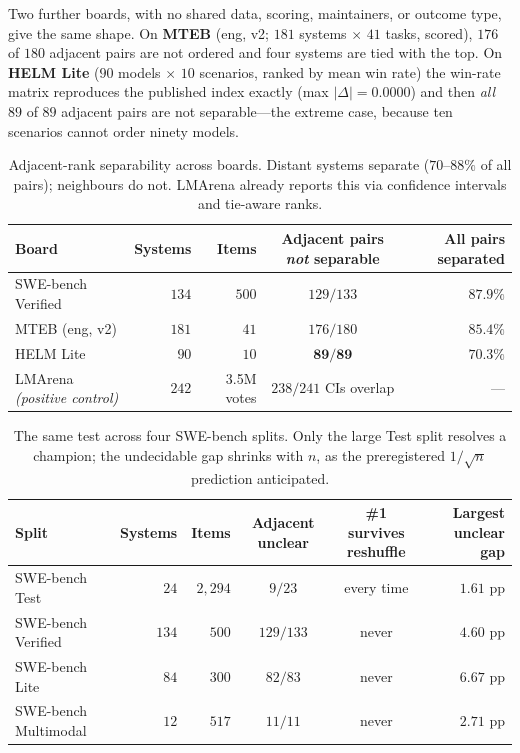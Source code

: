\documentclass{article}
\begin{document}
Two further boards, with no shared data, scoring, maintainers, or outcome type, give the same shape.
On \textbf{MTEB} (eng, v2; $181$ systems $\times$ $41$ tasks, scored), $176$ of $180$ adjacent pairs
are not ordered and four systems are tied with the top. On \textbf{HELM Lite} ($90$ models $\times$
$10$ scenarios, ranked by mean win rate) the win-rate matrix reproduces the published index exactly
(max $|\Delta| = 0.0000$) and then \emph{all} $89$ of $89$ adjacent pairs are not separable---the
extreme case, because ten scenarios cannot order ninety models.

\begin{table}[t]
\centering\small
\begin{tabular}{lrrcr}
\toprule
Board & Systems & Items & Adjacent pairs \emph{not} separable & All pairs separated\\
\midrule
SWE-bench Verified & $134$ & $500$ & $129/133$ & $87.9\%$\\
MTEB (eng, v2)     & $181$ & $41$  & $176/180$ & $85.4\%$\\
HELM Lite          & $90$  & $10$  & $\mathbf{89/89}$ & $70.3\%$\\
\midrule
LMArena \emph{(positive control)} & $242$ & 3.5M votes & $238/241$ CIs overlap & ---\\
\bottomrule
\end{tabular}
\caption{Adjacent-rank separability across boards. Distant systems separate ($70$--$88\%$ of all
pairs); neighbours do not. LMArena already reports this via confidence intervals and tie-aware ranks.}
\label{tab:main}
\end{table}

\begin{table}[t]
\centering\small
\begin{tabular}{lrrccr}
\toprule
Split & Systems & Items & Adjacent unclear & \#1 survives reshuffle & Largest unclear gap\\
\midrule
SWE-bench Test        & $24$  & $2{,}294$ & $9/23$  & every time & $1.61$ pp\\
SWE-bench Verified    & $134$ & $500$     & $129/133$ & never    & $4.60$ pp\\
SWE-bench Lite        & $84$  & $300$     & $82/83$ & never      & $6.67$ pp\\
SWE-bench Multimodal  & $12$  & $517$     & $11/11$ & never      & $2.71$ pp\\
\bottomrule
\end{tabular}
\caption{The same test across four SWE-bench splits. Only the large Test split resolves a champion;
the undecidable gap shrinks with $n$, as the preregistered $1/\sqrt{n}$ prediction anticipated.}
\label{tab:splits}
\end{table}
\end{document}
